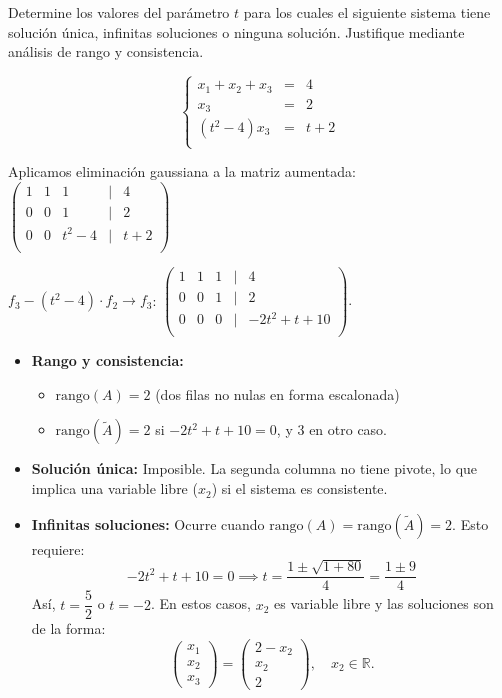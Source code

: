 \begin{prob} 
Determine los valores del parámetro \( t \) para los cuales el siguiente sistema tiene solución única, infinitas soluciones o ninguna solución. Justifique mediante análisis de rango y consistencia.

\[
\left\lbrace  
\begin{array}{rcl}
x_1 + x_2 + x_3 &=& 4 \\
x_3 &=& 2 \\
\left(t^2 - 4\right)x_3 &=& t + 2 \\
\end{array} 
\right. 
\]

\begin{myproof}
Aplicamos eliminación gaussiana a la matriz aumentada: \(
\begin{pmatrix}
1 & 1 & 1 & | & 4 \\
0 & 0 & 1 & | & 2 \\
0 & 0 & t^2-4 & | & t+2 \\
\end{pmatrix}
\)

\( f_3 - (t^2-4) \cdot f_2 \to f_3 \): \(
\begin{pmatrix}
1 & 1 & 1 & | & 4 \\
0 & 0 & 1 & | & 2 \\
0 & 0 & 0 & | & -2t^2 + t + 10 \\
\end{pmatrix}.
\)

\begin{itemize}
\item \textbf{Rango y consistencia:} 
  \begin{itemize}
  \item \(\text{rango}(A) = 2\) (dos filas no nulas en forma escalonada)
  \item \(\text{rango}(\tilde{A}) = 2\) si \(-2t^2 + t + 10 = 0\), y \(3\) en otro caso.
  \end{itemize}

\item \textbf{Solución única:} Imposible. La segunda columna no tiene pivote, lo que implica una variable libre (\(x_2\)) si el sistema es consistente.

\item \textbf{Infinitas soluciones:} Ocurre cuando \(\text{rango}(A) = \text{rango}(\tilde{A}) = 2\). Esto requiere:
  \[
  -2t^2 + t + 10 = 0 \implies t = \frac{1 \pm \sqrt{1 + 80}}{4} = \frac{1 \pm 9}{4}
  \]
  Así, \( t = \dfrac{5}{2} \) o \( t = -2 \). En estos casos, \(x_2\) es variable libre y las soluciones son de la forma:
  \[
  \begin{pmatrix} x_1 \\ x_2 \\ x_3 \end{pmatrix} = \begin{pmatrix} 2 - x_2 \\ x_2 \\ 2 \end{pmatrix}, \quad x_2 \in \mathbb{R}.
  \]


\end{itemize}
\end{myproof}
\end{prob}
